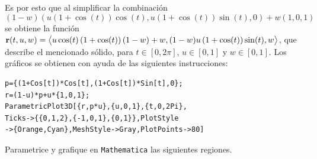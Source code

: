 Es por esto que al simplificar la combinación
$$\left( 1-w\right) \left( u\left( 1+\cos (t) \right) \cos \left(
t\right) ,u\left( 1+\cos (t) \right) \sin (t),0\right) +w\left( 1,0,1\right) $$
se obtiene la función
${\bf r}(t,u,w)=\big\langle u\cos (t) \left(
1+\cos (t) \right) \left( 1-w\right) +w,\linebreak (1-w)u\left( 1+\cos (t) \right) \sin (t),w \big\rangle $,
que describe el mencionado sólido, para $t\in [0,2\pi]$, $u\in [0,1]$ y $w\in [0,1]$.
Los gráficos se obtienen con ayuda de las siguientes instrucciones:

\begin{tcolorbox}[title=\bf Instrucción \verb"Mathematica"]
\begin{Verbatim}[formatcom=\letraverbatim]
p={(1+Cos[t])*Cos[t],(1+Cos[t])*Sin[t],0};
r=(1-u)*p+u*{1,0,1};
ParametricPlot3D[{r,p*u},{u,0,1},{t,0,2Pi},
Ticks->{{0,1,2},{-1,0,1},{0,1}},PlotStyle
->{Orange,Cyan},MeshStyle->Gray,PlotPoints->80]
\end{Verbatim}
\end{tcolorbox}

\begin{ejer}
Parametrice y grafique en \verb"Mathematica" las siguientes regiones.
\end{ejer}

